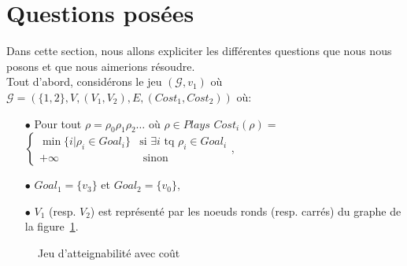 
\section{Questions posées}
\label{section:questionsPosees}

Dans cette section, nous allons expliciter les différentes questions que nous nous posons et que nous aimerions résoudre.\\


Tout d'abord, considérons le jeu $(\mathcal{G},v_{1})$ où $\mathcal{G} = ( \{ 1,2 \}, V, (V_{1}, V_{2}),E, (Cost _{1},Cost _{2}))$ où: \begin{enumerate}
\item[$\bullet$] Pour tout  $\rho = \rho _{0} \rho _{1} \rho _{2} \ldots $ où $\rho \in Plays$ $Cost_{i}(\rho) = $ $\begin{cases} 
								\min \{ i | \rho _{i} \in Goal_{i} \} & \text{si } \exists i \text{ tq } \rho _{i} \in Goal_{i} \\
								+\infty & \text{ sinon}
								\end{cases}$,
\item[$\bullet$] $Goal_{1} = \{ v_{3} \}$ et $Goal_{2} = \{ v_{0} \}$,
\item[$\bullet$]  $V_{1}$ (resp. $V_{2}$) est représenté par les noeuds ronds (resp. carrés) du graphe de la figure~\ref{ex:patologique}.

\end{enumerate}


\begin{figure}[ht!]
	\centering

	
	\caption{Jeu d'atteignabilité avec coût}
	\label{ex:patologique}
	

\end{figure}

